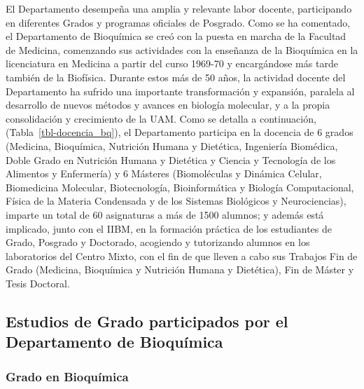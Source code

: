 \documentclass[
  11pt,
  a4paper,
  twoside]{scrreprt}
\begin{document}
El Departamento desempeña una amplia y relevante labor docente,
participando en diferentes Grados y programas oficiales de Posgrado.
Como se ha comentado, el Departamento de Bioquímica se creó con la
puesta en marcha de la Facultad de Medicina, comenzando sus actividades
con la enseñanza de la Bioquímica en la licenciatura en Medicina a
partir del curso 1969-70 y encargándose más tarde también de la
Biofísica. Durante estos más de 50 años, la actividad docente del
Departamento ha sufrido una importante transformación y expansión,
paralela al desarrollo de nuevos métodos y avances en biología
molecular, y a la propia consolidación y crecimiento de la UAM. Como se
detalla a continuación, (Tabla~\ref{tbl-docencia_bq}), el Departamento
participa en la docencia de 6 grados (Medicina, Bioquímica, Nutrición
Humana y Dietética, Ingeniería Biomédica, Doble Grado en Nutrición
Humana y Dietética y Ciencia y Tecnología de los Alimentos y Enfermería)
y 6 Másteres (Biomoléculas y Dinámica Celular, Biomedicina Molecular,
Biotecnología, Bioinformática y Biología Computacional, Física de la
Materia Condensada y de los Sistemas Biológicos y Neurociencias),
imparte un total de 60 asignaturas a más de 1500 alumnos; y además está
implicado, junto con el IIBM, en la formación práctica de los
estudiantes de Grado, Posgrado y Doctorado, acogiendo y tutorizando
alumnos en los laboratorios del Centro Mixto, con el fin de que lleven a
cabo sus Trabajos Fin de Grado (Medicina, Bioquímica y Nutrición Humana
y Dietética), Fin de Máster y Tesis Doctoral.

\subsection{Estudios de Grado participados por el Departamento de
Bioquímica}\label{estudios-de-grado-participados-por-el-departamento-de-bioquuxedmica}

\subsubsection{Grado en Bioquímica}\label{grado-en-bioquuxedmica}
\end{document}
